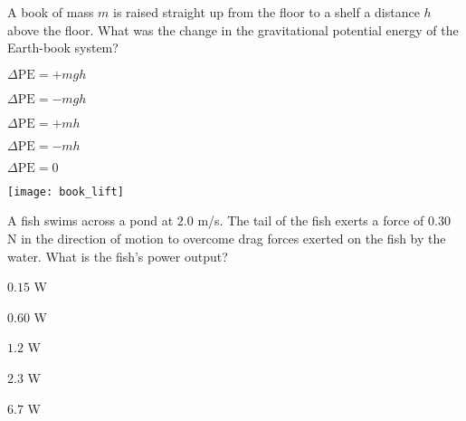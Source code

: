 \documentclass[11pt]{article}
\begin{document}
\begin{enumerate}


\begin{minipage}[t]{\lw}
\item A book of mass $m$ is raised straight up from the floor to a shelf a distance $h$ above the floor. What was the change in the gravitational potential energy of the Earth-book system?\\
\begin{minipage}[t]{.7\lw}
\begin{choices}
\item $\Delta\text{PE}=+mgh$
\item $\Delta\text{PE}=-mgh$
\item $\Delta\text{PE}=+mh$
\item $\Delta\text{PE}=-mh$
\item $\Delta\text{PE}=0$
\end{choices}
\end{minipage}\hfill
\begin{minipage}[t]{.2\lw}
\vspace{.2in}
\flushright
\texttt{[image: book\_lift]}
\end{minipage}
\end{minipage}

\begin{minipage}[t]{\lw}
\item A fish swims across a pond at $2.0$ m/s. The tail of the fish exerts a force of $0.30$ N in the direction of motion to overcome drag forces exerted on the fish by the water. What is the fish's power output?
\begin{choices}
\item $0.15$ W
\item $0.60$ W
\item $1.2$ W
\item $2.3$ W
\item $6.7$ W
\end{choices}
\end{minipage}


\end{enumerate}
\end{document}
